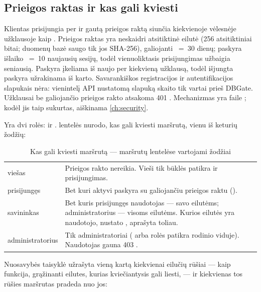 \subsection{Prieigos raktas ir kas gali kviesti}\label{sec:api:auth}

Klientas prisijungia per  ir gautą prieigos raktą siunčia kiekvienoje
vėlesnėje užklausoje kaip . Prieigos raktas yra neskaidri
atsitiktinė eilutė (256 atsitiktiniai bitai; duomenų bazė saugo tik jos SHA-256), galiojanti
~=~30 dienų; paskyra išlaiko ~=~10 naujausių sesijų,
todėl vienuoliktasis prisijungimas užbaigia seniausią. Paskyra įkeliama iš naujo per kiekvieną
užklausą, todėl išjungta paskyra užrakinama iš karto. Savarankiškos registracijos ir autentifikacijos
slapukais nėra: vienintelį API nustatomą slapuką  skaito tik vartai prieš
DBGate. Užklausai be galiojančio prieigos rakto atsakoma 401 . Mechanizmas yra
faile ; kodėl jis taip sukurtas, aiškinama \cref{ch:security}.

Yra dvi rolės:  ir .  lentelės nurodo, kas gali kviesti
maršrutą, vienu iš keturių žodžių:

\begin{table}[H]
\caption{Kas gali kviesti maršrutą --- maršrutų lentelėse vartojami žodžiai}\label{tab:api:who}
\begin{tabularx}{\textwidth}{@{}L{22mm}Y@{}}
\toprule
{} &  \\
\midrule
viešas & Prieigos rakto nereikia. Vieši tik būklės patikra ir prisijungimas. \\
prisijungęs & Bet kuri aktyvi paskyra su galiojančiu prieigos raktu (). \\
savininkas & Bet kuris prisijungęs naudotojas --- savo eilutėms; administratorius --- visoms
  eilutėms. Kurios eilutės yra naudotojo, nustato , aprašyta toliau. \\
administratorius & Tik administratoriai ( arba rolės patikra rodinio viduje).
  Naudotojas gauna 403 . \\
\bottomrule
\end{tabularx}
\end{table}

Nuosavybės taisyklė užrašyta vieną kartą kiekvienai eilučių rūšiai --- kaip funkcija, grąžinanti
eilutes, kurias kviečiantysis gali liesti, --- ir kiekvienas tos rūšies maršrutas pradeda nuo jos:

